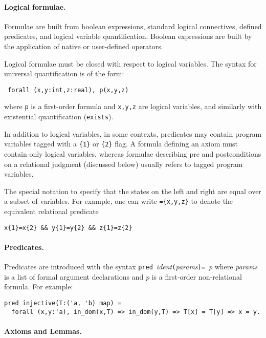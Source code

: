 \paragraph*{Logical formulae.}
Formulae are built from boolean expressions, standard logical
connectives, defined predicates, and logical variable
quantification. Boolean expressions are built by the application of
native or user-defined operators.

Logical formulae must be closed with respect to logical variables. The
syntax for universal quantification is of the form:
\begin{verbatim}
 forall (x,y:int,z:real), p(x,y,z)
\end{verbatim}
where \verb|p| is a first-order formula and \verb|x,y,z| are logical
variables, and similarly with existential quantification (\verb+exists+).

In addition to logical variables, in some contexts, predicates may
contain program variables tagged with a \verb|{1}| or \verb|{2}|
flag. A formula defining an axiom must contain only logical variables,
whereas formulae describing pre and postconditions on a relational
judgment (discussed below) usually refers to tagged program variables.


The special notation to specify that the states on the left and right
are equal over a subset of variables. For example, one can write
\verb|={x,y,z}| to denote the equivalent relational predicate
\begin{verbatim}
x{1}=x{2} && y{1}=y{2} && z{1}=z{2}
\end{verbatim}



\paragraph*{Predicates.}
Predicates are introduced with the syntax
\verb+pred+~\textit{ident}\verb+(+\textit{params}\verb+)=+~\textit{p}
where \textit{params} is a list of formal argument declarations and
\textit{p} is a first-order non-relational formula. For example:
\begin{verbatim}
pred injective(T:('a, 'b) map) = 
  forall (x,y:'a), in_dom(x,T) => in_dom(y,T) => T[x] = T[y] => x = y.
\end{verbatim}



\paragraph*{Axioms and Lemmas.}

